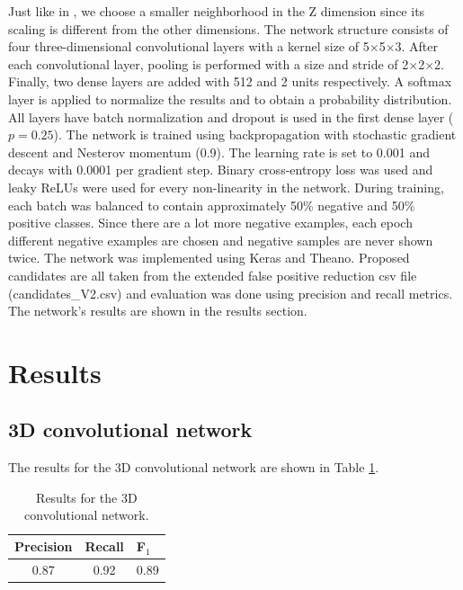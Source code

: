 \documentclass{article}
\begin{document}
Just like in \cite{qidou}, we choose a smaller neighborhood in the Z dimension since its scaling is different from the other dimensions.
The network structure consists of four three-dimensional convolutional layers with a kernel size of 5$\times$5$\times$3.
After each convolutional layer, pooling is performed with a size and stride of 2$\times$2$\times$2.
Finally, two dense layers are added with 512 and 2 units respectively.
A softmax layer is applied to normalize the results and to obtain a probability distribution.
All layers have batch normalization and dropout is used in the first dense layer ($p=0.25$).
The network is trained using backpropagation with stochastic gradient descent and Nesterov momentum (0.9).
The learning rate is set to 0.001 and decays with 0.0001 per gradient step.
Binary cross-entropy loss was used and leaky ReLUs were used for every non-linearity in the network.
During training, each batch was balanced to contain approximately 50\% negative and 50\% positive classes.
Since there are a lot more negative examples, each epoch different negative examples are chosen and negative samples are never shown twice.
The network was implemented using Keras and Theano.
Proposed candidates are all taken from the extended false positive reduction csv file (candidates\_V2.csv) and evaluation was done using precision and recall metrics.
The network's results are shown in the results section.


\section{Results}\label{sec:results}
\subsection{3D convolutional network}
The results for the 3D convolutional network are shown in Table \ref{tbl:results_3d}.

\begin{table}[h]
\caption{\small{Results for the 3D convolutional network.}}
\label{tbl:results_3d}
\vspace{0.2cm}
\centering
\begin{tabular}{c | c | l}
Precision & Recall & F$_1$\\
\hline \hline
0.87 & 0.92 & 0.89
\end{tabular}
\end{table}
\end{document}
